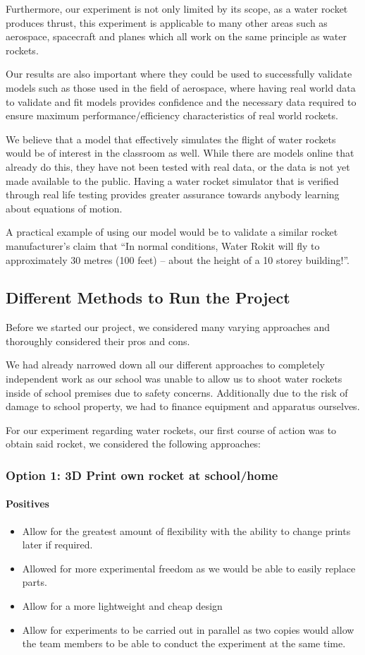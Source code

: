 \documentclass[14pt]{article}
\begin{document}
Furthermore, our experiment is not only limited by its scope, as a water rocket produces thrust, this experiment is applicable to many other areas such as aerospace, spacecraft and planes which all work on the same principle as water rockets.

Our results are also important where they could be used to successfully validate models such as those used in the field of aerospace, where having real world data to validate and fit models provides confidence and the necessary data required to ensure maximum performance/efficiency characteristics of real world rockets.

We believe that a model that effectively simulates the flight of water rockets would be of interest in the classroom as well. While there are models online that already do this, they have not been tested with real data, or the data is not yet made available to the public. Having a water rocket simulator that is verified through real life testing provides greater assurance towards anybody learning about equations of motion.

A practical example of using our model would be to validate a similar rocket manufacturer's claim that ``In normal conditions, Water Rokit will fly to approximately 30 metres (100 feet) – about the height of a 10 storey building!''. \cite{1}
\subsection{Different Methods to Run the Project}
Before we started our project, we considered many varying approaches and thoroughly considered their pros and cons.

We had already narrowed down all our different approaches to completely independent work as our school was unable to allow us to shoot water rockets inside of school premises due to safety concerns.
Additionally due to the risk of damage to school property, we had to finance equipment and apparatus ourselves.

For our experiment regarding water rockets, our first course of action was to obtain said rocket, we considered the following approaches:
\subsubsection{Option 1: 3D Print own rocket at school/home}
\paragraph{Positives}
\begin{itemize}
    \item Allow for the greatest amount of flexibility with the ability to change prints later if required.
    \item Allowed for more experimental freedom as we would be able to easily replace parts.
    \item Allow for a more lightweight and cheap design
    \item Allow for experiments to be carried out in parallel as two copies would allow the team members to be able to conduct the experiment at the same time.
\end{itemize}
\end{document}
